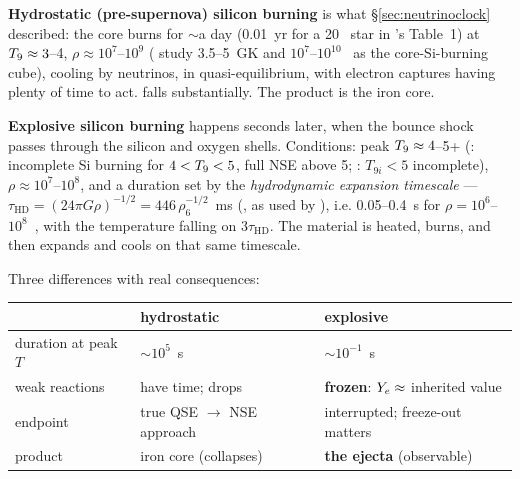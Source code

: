 \textbf{Hydrostatic (pre-supernova) silicon burning} is what
\S\ref{sec:neutrinoclock} described: the core burns for $\sim$a day (0.01~yr
for a 20~\Msun{} star in \citealt{hix1999b}'s Table~1) at
$T_{9} \approx 3$--4, $\rho \approx 10^{7}$--$10^{9}$ (\citealt{hix1996} study
3.5--5~GK and $10^{7}$--$10^{10}$~\gcc{} as the core-Si-burning cube), cooling
by neutrinos, in quasi-equilibrium, with electron captures having plenty of
time to act. \Ye{} falls substantially. The product is the iron core.

\textbf{Explosive silicon burning} happens seconds later, when the bounce shock
passes through the silicon and oxygen shells. Conditions: peak
$T_{9} \approx 4$--5+ (\citealt{boccioli2024}: incomplete Si burning for
$4 < T_{9} < 5$, full NSE above 5; \citealt{hix1999a}: $T_{9i} < 5$ incomplete),
$\rho \approx 10^{7}$--$10^{8}$, and a duration set by the \emph{hydrodynamic
expansion timescale} --- $\tau_{\mathrm{HD}} = (24\pi G\rho)^{-1/2} =
446\,\rho_6^{-1/2}$~ms (\citealt{fowler1964}, as used by \citealt[eq.~1]{hix1999a}),
i.e. 0.05--0.4~s for $\rho = 10^{6}$--$10^{8}$~\gcc, with the temperature
falling on $3\tau_{\mathrm{HD}}$. The material is heated, burns, and then
expands and cools on that same timescale.

Three differences with real consequences:

\begin{center}
\begingroup\small
\begin{tabularx}{\textwidth}{@{}L{3.0cm} Y Y@{}}
\toprule
 & \textbf{hydrostatic} & \textbf{explosive} \\
\midrule
duration at peak $T$ & $\sim 10^{5}$~s & $\sim 10^{-1}$~s \\
weak reactions & have time; \Ye{} drops & \textbf{frozen}: $Y_{e} \approx$
  inherited value \\
endpoint & true QSE $\to$ NSE approach & interrupted; freeze-out matters \\
product & iron core (collapses) & \textbf{the ejecta} (observable) \\
\bottomrule
\end{tabularx}
\endgroup
\end{center}

